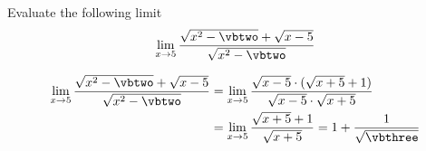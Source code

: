 


\SQUARE\vbone\vbtwo
\MULTIPLY{}\vbthree

\question[1] Evaluate the following limit \[ \lim_{x\to\vbone}\dfrac{\sqrt{x^2 -\vbtwo} + \sqrt{x-\vbone}}{\sqrt{x^2-\vbtwo}}\]

\watchout

\begin{solution}[\mcq]
  \begin{align}
    \lim_{x\to\vbone}\dfrac{\sqrt{x^2-\vbtwo} + \sqrt{x-\vbone}}{\sqrt{x^2-\vbtwo}} &= 
    \lim_{x\to\vbone}\dfrac{\sqrt{x-\vbone}\cdot (\sqrt{x+\vbone} + 1)}{\sqrt{x-\vbone}\cdot\sqrt{x + \vbone}} \\
    &= \lim_{x\to\vbone}\dfrac{\sqrt{x+\vbone} + 1}{\sqrt{x + \vbone}} 
    = 1 + \frac{1}{\sqrt\vbthree}
  \end{align}
\end{solution}

